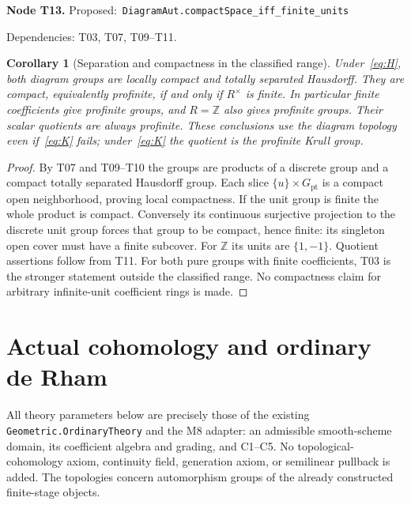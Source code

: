 \documentclass[11pt]{article}
\newtheorem{corollary}[theorem]{Corollary}
\theoremstyle{remark}\newtheorem{remark}[theorem]{Remark}
\newcommand{\Z}{\mathbb Z}
\newcommand{\code}[1]{{\normalfont\nolinkurl{#1}}}
\newcommand{\node}[3]{\par\Needspace{8\baselineskip}\smallskip\noindent\textbf{Node #1.}\quad
 \textsf{Proposed:}\ \code{#2}\par\noindent
 \textsf{Dependencies:} #3.\par\smallskip}
\begin{document}
\node{T13}{DiagramAut.compactSpace_iff_finite_units}{T03, T07, T09--T11}
\begin{corollary}[Separation and compactness in the classified range]\label{cor:t13}
Under~\eqref{eq:H}, both diagram groups are locally compact and
totally separated Hausdorff. They are compact, equivalently profinite,
if and only if $R^\times$ is finite. In particular finite coefficients
give profinite groups, and $R=\Z$ also gives profinite groups.
Their scalar quotients are always profinite. These conclusions use
the diagram topology even if~\eqref{eq:K} fails; under~\eqref{eq:K}
the quotient is the profinite Krull group.
\end{corollary}
\begin{proof}
By T07 and T09--T10 the groups are products of a discrete group and
a compact totally separated Hausdorff group. Each slice
$\{u\}\times G_{\mathrm{pt}}$ is a compact open neighborhood, proving
local compactness. If the unit group is finite the whole product is
compact. Conversely its continuous surjective projection to the
discrete unit group forces that group to be compact, hence finite:
its singleton open cover must have a finite subcover. For $\Z$ its
units are $\{1,-1\}$. Quotient assertions follow from T11.
For both pure groups with finite coefficients, T03 is the stronger
statement outside the classified range. No compactness claim for
arbitrary infinite-unit coefficient rings is made.
\end{proof}

\section{Actual cohomology and ordinary de Rham}
\label{sec:cohomology}

All theory parameters below are precisely those of the existing
\code{Geometric.OrdinaryTheory} and the M8 adapter: an admissible
smooth-scheme domain, its coefficient algebra and grading, and C1--C5.
No topological-cohomology axiom, continuity field, generation axiom,
or semilinear pullback is added. The topologies concern automorphism
groups of the already constructed finite-stage objects.
\end{document}
